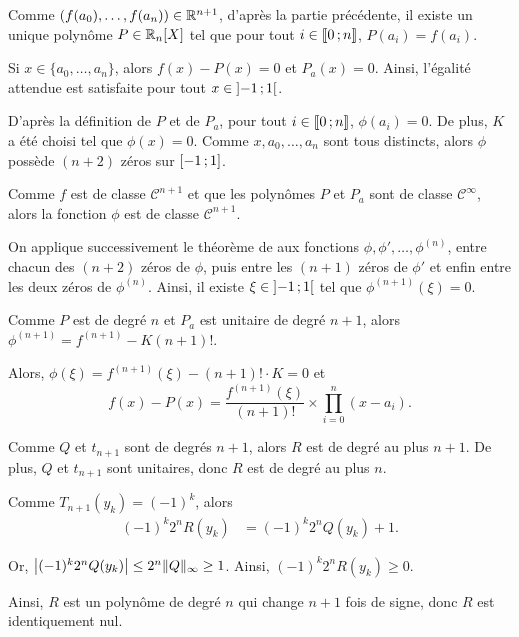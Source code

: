 \begin{solution}
\begin{reponses}
\item Comme $(f(a_0),\ldots,f(a_n)) \in \mathbb{R}^{n+1}$, d'après la partie précédente, il existe un unique polynôme $P \in \mathbb{R}_n[X]$ tel que pour tout $i \in \llbracket 0\,; n \rrbracket$, $P(a_i) = f(a_i)$.

\item Si $x \in \{a_0,\ldots,a_n\}$, alors $f(x) - P(x) = 0$ et $P_a(x) = 0$. Ainsi, l'égalité attendue est satisfaite pour tout $x \in \left]-1\,;1\right[$.

\item D'après la définition de $P$ et de $P_a$, pour tout $i \in \llbracket 0\,; n \rrbracket$, $\phi(a_i) = 0$. De plus, $K$ a été choisi tel que $\phi(x) = 0$. Comme $x, a_0,\ldots,a_n$ sont tous distincts, alors $\phi$ possède $(n + 2)$ zéros sur $\left[-1\,;1\right]$.

\item Comme $f$ est de classe $\mathscr{C}^{n+1}$ et que les polynômes $P$ et $P_a$ sont de classe $\mathscr{C}^\infty$, alors la fonction $\phi$ est de classe $\mathscr{C}^{n+1}$.

On applique successivement le théorème de  aux fonctions $\phi, \phi',\ldots, \phi^{(n)}$, entre chacun des $(n+2)$ zéros de $\phi$, puis entre les $(n+1)$ zéros de $\phi'$ et enfin entre les deux zéros de $\phi^{(n)}$. Ainsi, il existe $\xi \in \left]-1\,;1\right[$ tel que $\phi^{(n+1)}(\xi) = 0$.

Comme $P$ est de degré $n$ et $P_a$ est unitaire de degré $n+1$, alors $\phi^{(n+1)} = f^{(n+1)} - K (n+1)!$.

Alors, $\phi(\xi) = f^{(n+1)}(\xi) - (n+1)! \cdot K = 0$ et
\[
f(x) - P(x) = \frac{f^{(n+1)}(\xi)}{(n+1)!} \times \prod_{i=0}^n (x-a_i).
\]

\item Comme $Q$ et $t_{n+1}$ sont de degrés $n+1$, alors $R$ est de degré au plus $n+1$. De plus, $Q$ et $t_{n+1}$ sont unitaires, donc $R$ est de degré au plus $n$.

\item Comme $T_{n+1} (y_k) = (-1)^k$, alors
\begin{align*}
(-1)^k 2^n R(y_k)
&= (-1)^k 2^n Q(y_k) + 1.
\end{align*}

Or, $\mathopen{}\left| (-1)^k 2^n Q(y_k) \right| \leq 2^n \Vert Q \Vert_\infty \geq 1$. Ainsi, $(-1)^k 2^n R(y_k) \geq 0$.

Ainsi, $R$ est un polynôme de degré $n$ qui change $n+1$ fois de signe, donc $R$ est identiquement nul.


\end{reponses}
\end{solution}
